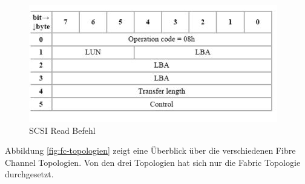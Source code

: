 \begin{figure}
\centering
\includegraphics[width=0.7\linewidth]{fig/scsi-read}
\caption{SCSI Read Befehl}
\label{fig:scsi-read}
\end{figure}

Abbildung \ref{fig:fc-topologien} zeigt eine Überblick über die verschiedenen Fibre Channel Topologien. Von den drei Topologien hat sich nur die Fabric Topologie durchgesetzt. 

